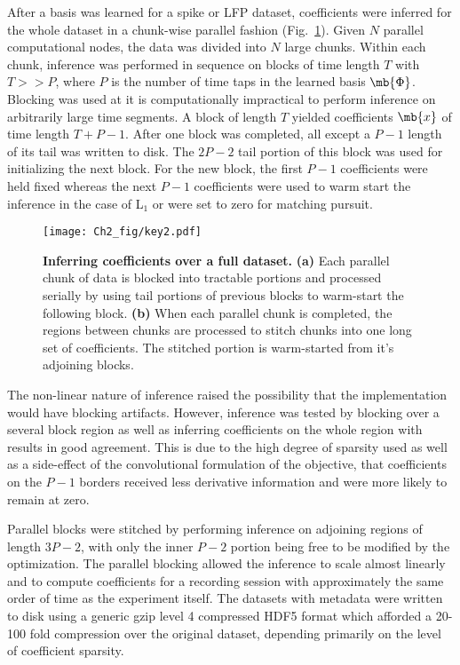After a basis was learned for a spike or LFP dataset, coefficients
were inferred for the whole dataset in a chunk-wise parallel fashion
(Fig.~\ref{fig:parallelblock}). Given $N$ parallel computational
nodes, the data was divided into $N$ large chunks. Within each chunk,
inference was performed in sequence on blocks of time length $T$ with
$T >> P$, where $P$ is the number of time taps in the learned basis
$\mb{\Phi}$. Blocking was used at it is computationally impractical to
perform inference on arbitrarily large time segments. A block of
length $T$ yielded coefficients $\mb{x}$ of time length $T+P-1$. After
one block was completed, all except a $P-1$ length of its tail was
written to disk. The $2P-2$ tail portion of this block was used for
initializing the next block. For the new block, the first $P-1$
coefficients were held fixed whereas the next $P-1$ coefficients were
used to warm start the inference in the case of L$_1$ or were set to
zero for matching pursuit.

\begin{figure}[ht!]
  \centering
  \texttt{[image: Ch2\_fig/key2.pdf]}
  \caption{\textbf{Inferring coefficients over a full dataset.}
    \textbf{(a)} Each parallel chunk of data is blocked into tractable
    portions and processed serially by using tail portions of previous
    blocks to warm-start the following block. \textbf{(b)} When each
    parallel chunk is completed, the regions between chunks are
    processed to stitch chunks into one long set of coefficients. The
    stitched portion is warm-started from it's adjoining blocks.}
  \label{fig:parallelblock}
\end{figure}

The non-linear nature of inference raised the possibility that the
implementation would have blocking artifacts. However, inference was
tested by blocking over a several block region as well as inferring
coefficients on the whole region with results in good agreement. This
is due to the high degree of sparsity used as well as a side-effect of
the convolutional formulation of the objective, that coefficients on
the $P-1$ borders received less derivative information and were more
likely to remain at zero.

Parallel blocks were stitched by performing inference on adjoining
regions of length $3P-2$, with only the inner $P-2$ portion being free
to be modified by the optimization. The parallel blocking allowed the
inference to scale almost linearly and to compute coefficients for a
recording session with approximately the same order of time as the
experiment itself. The datasets with metadata were written to disk
using a generic gzip level 4 compressed HDF5 format which afforded a
20-100 fold compression over the original dataset, depending primarily
on the level of coefficient sparsity.

